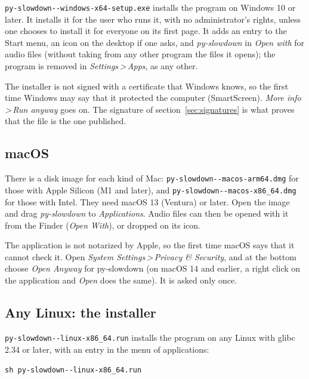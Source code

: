 \documentclass[12pt,
              article,
              oneside
              ]{memoir}
\renewenvironment{quote}%
 {\begin{list}{}%
              {\setlength\rightmargin{0pt}%
              \setlength\leftmargin{\parindent}}%
  \item[]\small\ignorespaces}
 {\unskip\end{list}}
\newcommand*{\menu}[1]{\textit{#1}}
\newcommand*{\then}{\,>\,}
\begin{document}
%
\texttt{py-slowdown-\version-windows-x64-setup.exe} installs the program on
Windows 10 or later. It installs it for the user who runs it, with no
administrator's rights, unless one chooses to install it for everyone on
its first page. It adds an entry to the Start menu, an icon on the desktop
if one asks, and \menu{py-slowdown} in \menu{Open with} for audio files
(without taking from any other program the files it opens); the program is
removed in \menu{Settings\then Apps}, as any other.

%
The installer is not signed with a certificate that Windows knows, so the
first time Windows may say that it protected the computer
(SmartScreen). \menu{More info\then Run anyway} goes on. The signature of
section~\ref{sec:signatures} is what proves that the file is the one
published.

\subsection{macOS}

%
There is a disk image for each kind of Mac: \texttt{py-slowdown-\version-macos-arm64.dmg}
for those with Apple Silicon (M1 and later), and
\texttt{py-slowdown-\version-macos-x86\_64.dmg} for those with Intel. They
need macOS 13 (Ventura) or later. Open the image and drag
\menu{py-slowdown} to \menu{Applications}. Audio files can then be opened
with it from the Finder (\menu{Open With}), or dropped on its icon.

%
The application is not notarized by Apple, so the first time macOS says
that it cannot check it. Open \menu{System Settings\then Privacy \&
Security}, and at the bottom choose \menu{Open Anyway} for py-slowdown
(on macOS 14 and earlier, a right click on the application and
\menu{Open} does the same). It is asked only once.

\subsection{Any Linux: the installer}

%
\texttt{py-slowdown-\version-linux-x86\_64.run} installs the program on any
Linux with glibc 2.34 or later, with an entry in the menu of applications:

\begin{quote}
\texttt{sh py-slowdown-\version-linux-x86\_64.run}
\end{quote}
\end{document}
